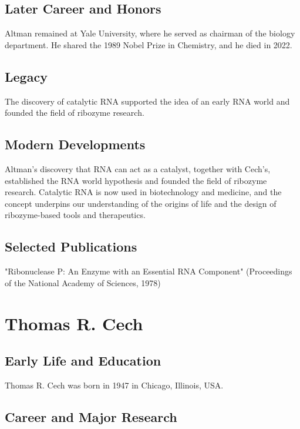 \subsection*{Later Career and Honors}

Altman remained at Yale University, where he served as chairman of the biology department. He shared the 1989 Nobel Prize in Chemistry, and he died in 2022.

\subsection*{Legacy}

The discovery of catalytic RNA supported the idea of an early RNA world and founded the field of ribozyme research.

\subsection*{Modern Developments}

Altman's discovery that RNA can act as a catalyst, together with Cech's, established the RNA world hypothesis and founded the field of ribozyme research. Catalytic RNA is now used in biotechnology and medicine, and the concept underpins our understanding of the origins of life and the design of ribozyme-based tools and therapeutics.

\subsection*{Selected Publications}

"Ribonuclease P: An Enzyme with an Essential RNA Component" (Proceedings of the National Academy of Sciences, 1978)

\clearpage

\section{Thomas R. Cech}

\subsection*{Early Life and Education}

Thomas R. Cech was born in 1947 in Chicago, Illinois, USA.

\subsection*{Career and Major Research}

